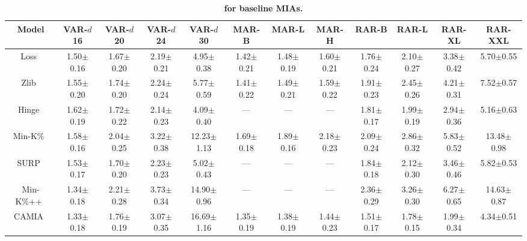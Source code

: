 \begin{table}[h!]
    \centering
    \tiny
\caption{\textbf{\tprat for baseline MIAs.}}
\setlength{\tabcolsep}{3pt}
\begin{tabular}{cccccccccccc}
\toprule
        Model & VAR-$\mathit{d}$16 & VAR-$\mathit{d}$20 & VAR-$\mathit{d}$24 & VAR-$\mathit{d}$30 & MAR-B & MAR-L & MAR-H & RAR-B & RAR-L & RAR-XL & RAR-XXL \\
\midrule

Loss~\citep{yeom2018lossmia} & 1.50{\tiny $\pm$0.16} & 1.67{\tiny $\pm$0.20} & 2.19{\tiny $\pm$0.21} & 4.95{\tiny $\pm$0.38} & 1.42{\tiny $\pm$0.21} & 1.48{\tiny $\pm$0.19} & 1.60{\tiny $\pm$0.21} & 1.76{\tiny $\pm$0.24} & 2.10{\tiny $\pm$0.27} & 3.38{\tiny $\pm$0.42} & 5.70{\tiny $\pm$0.55} \\
Zlib~\citep{carlini2021extractLLM} & 1.55{\tiny $\pm$0.20} & 1.74{\tiny $\pm$0.20} & 2.24{\tiny $\pm$0.24} & 5.77{\tiny $\pm$0.59} & 1.41{\tiny $\pm$0.22} & 1.49{\tiny $\pm$0.21} & 1.59{\tiny $\pm$0.22} & 1.91{\tiny $\pm$0.23} & 2.45{\tiny $\pm$0.26} & 4.21{\tiny $\pm$0.31} & 7.52{\tiny $\pm$0.57} \\
Hinge~\citep{bertran2024scalable} & 1.62{\tiny $\pm$0.19} & 1.72{\tiny $\pm$0.22} & 2.14{\tiny $\pm$0.23} & 4.09{\tiny $\pm$0.40} & --- & --- & --- & 1.81{\tiny $\pm$0.17} & 1.99{\tiny $\pm$0.19} & 2.94{\tiny $\pm$0.36} & 5.16{\tiny $\pm$0.63} \\
Min-K\%~\citep{shi2024detecting} & 1.58{\tiny $\pm$0.16} & 2.04{\tiny $\pm$0.25} & 3.22{\tiny $\pm$0.38} & 12.23{\tiny $\pm$1.13} & 1.69{\tiny $\pm$0.18} & 1.89{\tiny $\pm$0.16} & 2.18{\tiny $\pm$0.23} & 2.09{\tiny $\pm$0.24} & 2.86{\tiny $\pm$0.32} & 5.83{\tiny $\pm$0.52} & 13.48{\tiny $\pm$0.98} \\
SURP~\citep{zhang2024adaptive} & 1.53{\tiny $\pm$0.17} & 1.70{\tiny $\pm$0.20} & 2.23{\tiny $\pm$0.23} & 5.02{\tiny $\pm$0.43} & --- & --- & --- & 1.84{\tiny $\pm$0.18} & 2.12{\tiny $\pm$0.30} & 3.46{\tiny $\pm$0.46} & 5.82{\tiny $\pm$0.53} \\
Min-K\%++~\citep{zhang2024min} & 1.34{\tiny $\pm$0.18} & 2.21{\tiny $\pm$0.28} & 3.73{\tiny $\pm$0.34} & 14.90{\tiny $\pm$0.96} & --- & --- & --- & 2.36{\tiny $\pm$0.29} & 3.26{\tiny $\pm$0.30} & 6.27{\tiny $\pm$0.65} & 14.63{\tiny $\pm$0.87} \\
CAMIA~\citep{chang2024context} & 1.33{\tiny $\pm$0.18} & 1.76{\tiny $\pm$0.19} & 3.07{\tiny $\pm$0.35} & 16.69{\tiny $\pm$1.16} & 1.35{\tiny $\pm$0.19} & 1.38{\tiny $\pm$0.19} & 1.44{\tiny $\pm$0.23} & 1.51{\tiny $\pm$0.17} & 1.78{\tiny $\pm$0.15} & 1.99{\tiny $\pm$0.34} & 4.34{\tiny $\pm$0.51} \\


\bottomrule
\end{tabular}
\label{tab:tpr_baseline_mias}
\end{table}


